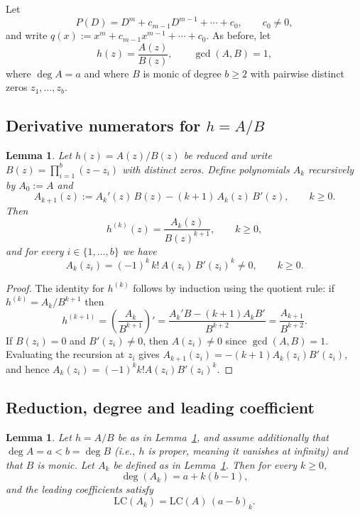 \documentclass[12pt]{article}
\theoremstyle{plain}
\newtheorem{lemma}[theorem]{Lemma}
\theoremstyle{definition}
\begin{document}
Let
$$P(D)=D^m+c_{m-1}D^{m-1}+\cdots+c_0,\qquad c_0\neq0,$$
and write $q(x):=x^m+c_{m-1}x^{m-1}+\cdots+c_0$.
As before, let
$$h(z)=\frac{A(z)}{B(z)},\qquad \gcd(A,B)=1,$$
where $\deg A=a$ and where $B$ is monic of degree $b\ge2$ with pairwise distinct zeros $z_1,\dots,z_b$.

\subsection{Derivative numerators for $h=A/B$}

\begin{lemma}\label{lem:Ak}
Let $h(z)=A(z)/B(z)$ be reduced and write $B(z)=\prod_{i=1}^b (z-z_i)$ with distinct zeros.
Define polynomials $A_k$ recursively by $A_0:=A$ and
$$A_{k+1}(z):=A_k'(z)\,B(z)-(k+1)\,A_k(z)\,B'(z),\qquad k\ge0.$$
Then
$$h^{(k)}(z)=\frac{A_k(z)}{B(z)^{k+1}},\qquad k\ge0,$$
and for every $i\in\{1,\dots,b\}$ we have
$$A_k(z_i)=(-1)^k\,k!\,A(z_i)\,B'(z_i)^k\neq 0,\qquad k\ge0.$$
\end{lemma}

\begin{proof}
The identity for $h^{(k)}$ follows by induction using the quotient rule:
if $h^{(k)}=A_k/B^{k+1}$ then
$$h^{(k+1)}=\left(\frac{A_k}{B^{k+1}}\right)'
=\frac{A_k'B-(k+1)A_kB'}{B^{k+2}}
=\frac{A_{k+1}}{B^{k+2}}.$$
If $B(z_i)=0$ and $B'(z_i)\neq0$, then $A(z_i)\neq0$ since $\gcd(A,B)=1$.
Evaluating the recursion at $z_i$ gives
$A_{k+1}(z_i)=-(k+1)A_k(z_i)B'(z_i)$, and hence
$A_k(z_i)=(-1)^k k! A(z_i)B'(z_i)^k$.
\end{proof}

\subsection{Reduction, degree and leading coefficient}

\begin{lemma}\label{lem:Ak_degree_LC}
Let $h=A/B$ be as in Lemma~\ref{lem:Ak}, and assume additionally that $\deg A=a<b=\deg B$ (i.e., $h$ is \emph{proper}, meaning it vanishes at infinity) and that $B$ is monic.
Let $A_k$ be defined as in Lemma~\ref{lem:Ak}.
Then for every $k\ge0$,
\begin{equation}\label{eq:Ak_deg}
\deg(A_k)=a+k(b-1),
\end{equation}
and the leading coefficients satisfy
\begin{equation}\label{eq:Ak_LC}
\mathrm{LC}(A_k)=\mathrm{LC}(A)\,(a-b)_k.
\end{equation}
\end{lemma}
\end{document}
